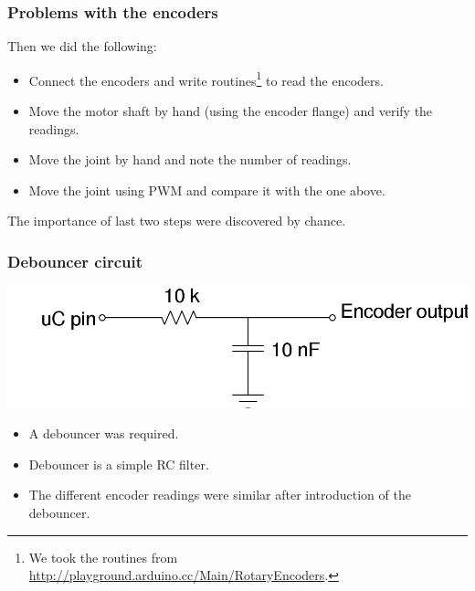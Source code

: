 \documentclass{beamer}
\begin{document}
  \begin{frame}
    
    \frametitle{Problems with the encoders}
    Then we did the following:
    \begin{itemize}
    \item<2-> Connect the encoders and write routines\footnote{We took the routines from
    \url{http://playground.arduino.cc/Main/RotaryEncoders}.} to read the
      encoders.
    \item<3-> Move the motor shaft by hand (using the encoder flange) and
      verify the readings.
    \item<4-> Move the joint by hand and note the number of readings.
    \item<5-> Move the joint using PWM and compare it with the one above.
    \end{itemize}
    
     The importance of last two steps were discovered by chance.\\
  \end{frame}
  
  \begin{frame}
    \frametitle{Debouncer circuit}
    \includegraphics[scale=0.3]{../Report/debouncer.jpg}\\
    \vspace{1cm}
    \begin{itemize}
    \item<1-> A debouncer was required.
    \item<2-> Debouncer is a  simple RC filter.
    \item<3-> The different encoder readings were similar after
    introduction of the debouncer.
    \end{itemize}
  \end{frame}
  
\end{document}
